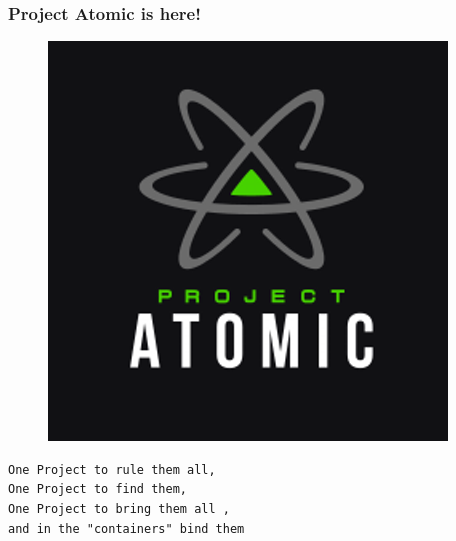 \documentclass{beamer}
\begin{document}
\begin{frame}[fragile]
\frametitle{Project Atomic is here!}
\begin{figure}[htp]
\centering
\includegraphics[scale=0.25]{atomic_logo.png}
\label{}
\end{figure}
\begin{verbatim}
One Project to rule them all, 
One Project to find them,
One Project to bring them all ,
and in the "containers" bind them
\end{verbatim}
\end{frame}
\end{document}
